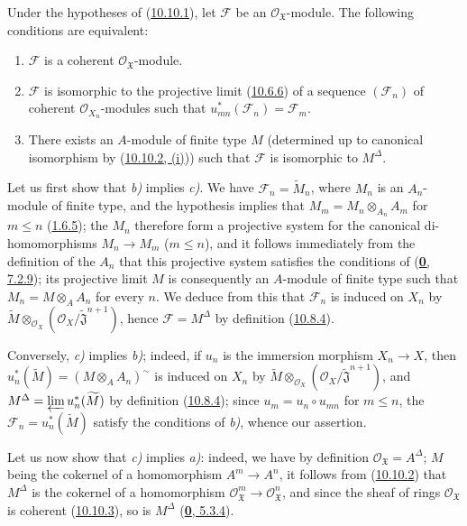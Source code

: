 \begin{proposition}[10.10.5]
\label{I.10.10.5}
Under the hypotheses of \textup{(\hyperref[I.10.10.1]{10.10.1})}, let
$\mathscr{F}$ be an $\mathscr{O}_{\mathfrak{X}}$-module. The following
conditions are equivalent:
\begin{enumerate}
  \item[\textup{a)}] $\mathscr{F}$ is a coherent $\mathscr{O}_{\mathfrak{X}}$-module.
  \item[\textup{b)}] $\mathscr{F}$ is isomorphic to the projective limit
    \textup{(\hyperref[I.10.6.6]{10.6.6})} of a sequence $(\mathscr{F}_n)$ of
    coherent $\mathscr{O}_{X_n}$-modules such that
    $u_{mn}^*(\mathscr{F}_n)=\mathscr{F}_m$.
  \item[\textup{c)}] There exists an $A$-module of finite type $M$ (determined up
    to canonical isomorphism by
    \textup{(\hyperref[I.10.10.2]{10.10.2, (i)})}) such that $\mathscr{F}$ is
    isomorphic to $M^\Delta$.
\end{enumerate}
\end{proposition}

Let us first show that \emph{b)} implies \emph{c)}. We have
$\mathscr{F}_n=\widetilde{M}_n$, where $M_n$ is an $A_n$-module of
finite type, and the hypothesis implies that
$M_m=M_n\otimes_{A_n}A_m$ for $m\leq n$
(\hyperref[I.1.6.5]{1.6.5}); the $M_n$ therefore form a projective
system for the canonical di-homomorphisms $M_n\to M_m$
($m\leq n$), and it follows immediately from the definition of the $A_n$
that this projective system satisfies the conditions of
(\hyperref[0.7.2.9]{\textbf{0}, 7.2.9}); its projective limit $M$ is
consequently an $A$-module of finite type such that
$M_n=M\otimes_A A_n$ for every $n$. We deduce from this that
$\mathscr{F}_n$ is induced on $X_n$ by
$\widetilde M\otimes_{\mathscr{O}_X}
(\mathscr{O}_X/\widetilde{\mathfrak{J}}^{n+1})$, hence
$\mathscr{F}=M^\Delta$ by definition
(\hyperref[I.10.8.4]{10.8.4}).

Conversely, \emph{c)} implies \emph{b)}; indeed, if $u_n$ is the immersion morphism
$X_n\to X$, then
$u_n^*(\widetilde M)=(M\otimes_A A_n)^{\sim}$ is induced on $X_n$ by
$\widetilde M\otimes_{\mathscr{O}_X}
(\mathscr{O}_X/\widetilde{\mathfrak{J}}^{n+1})$, and
$M^\Delta=\varprojlim u_n^*(\widetilde M)$ by definition
(\hyperref[I.10.8.4]{10.8.4}); since
$u_m=u_n\circ u_{mn}$ for $m\leq n$, the
$\mathscr{F}_n=u_n^*(\widetilde M)$ satisfy the conditions of \emph{b)},
whence our assertion.

Let us now show that \emph{c)} implies \emph{a)}: indeed, we have by definition
$\mathscr{O}_{\mathfrak{X}}=A^\Delta$; $M$ being the cokernel of a
homomorphism $A^m\to A^n$, it follows from
(\hyperref[I.10.10.2]{10.10.2}) that $M^\Delta$ is the cokernel of a
homomorphism
$\mathscr{O}_{\mathfrak{X}}^m\to\mathscr{O}_{\mathfrak{X}}^n$, and
since the sheaf of rings $\mathscr{O}_{\mathfrak{X}}$ is coherent
(\hyperref[I.10.10.3]{10.10.3}), so is $M^\Delta$
(\hyperref[0.5.3.4]{\textbf{0}, 5.3.4}).

